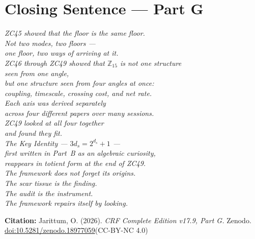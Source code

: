 \documentclass[12pt, a4paper]{article}
\begin{document}
\newpage


\section*{Closing Sentence --- Part G}

\begin{center}
\textit{%
ZC45 showed that the floor is the same floor.\\
Not two modes, two floors ---\\
one floor, two ways of arriving at it.\\[0.4em]
ZC46 through ZC49 showed that $\mathbb{Z}_{15}$ is not one structure\\
seen from one angle,\\
but one structure seen from four angles at once:\\
coupling, timescale, crossing cost, and net rate.\\[0.4em]
Each axis was derived separately\\
across four different papers over many sessions.\\
ZC49 looked at all four together\\
and found they fit.\\[0.4em]
The Key Identity --- $3d_s = 2^{d_s}+1$ ---\\
first written in Part~B as an algebraic curiosity,\\
reappears in totient form at the end of ZC49.\\
The framework does not forget its origins.\\[0.4em]
The scar tissue is the finding.\\
The audit is the instrument.\\
The framework repairs itself by looking.}
\end{center}

\bigskip
\begin{center}
\textbf{Citation:} Jarittum, O. (2026).
\textit{CRF Complete Edition v17.9, Part G.}
Zenodo.
\href{https://doi.org/10.5281/zenodo.18977059}%
{doi:10.5281/zenodo.18977059}\quad (CC-BY-NC 4.0)
\end{center}

\end{document}
